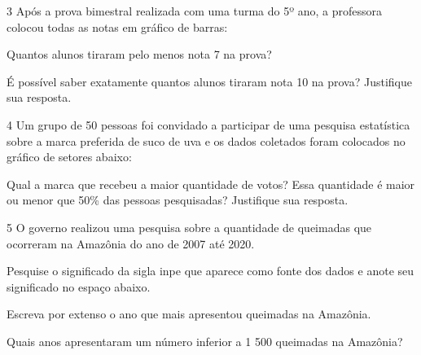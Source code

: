 \num{3} Após a prova bimestral realizada com uma turma do 5º ano, a
professora colocou todas as notas em gráfico de barras:


\begin{escolha}
\item
  Quantos alunos tiraram pelo menos nota 7 na prova?


\item
  É possível saber exatamente quantos alunos tiraram nota 10 na prova?
  Justifique sua resposta.

\end{escolha}


\num{4} Um grupo de 50 pessoas foi convidado a participar de uma pesquisa
estatística sobre a marca preferida de suco de uva e os dados coletados
foram colocados no gráfico de setores abaixo:


Qual a marca que recebeu a maior quantidade de votos? Essa quantidade é
maior ou menor que 50\% das pessoas pesquisadas? Justifique sua
resposta.



\num{5} O governo realizou uma pesquisa sobre a quantidade de queimadas que
ocorreram na Amazônia do ano de 2007 até 2020.


\begin{escolha}
\item
  Pesquise o significado da sigla inpe que aparece como fonte dos dados
  e anote seu significado no espaço abaixo.


\item
  Escreva por extenso o ano que mais apresentou queimadas na Amazônia.


\item
  Quais anos apresentaram um número inferior a 1 500 queimadas na
  Amazônia?

\end{escolha}

